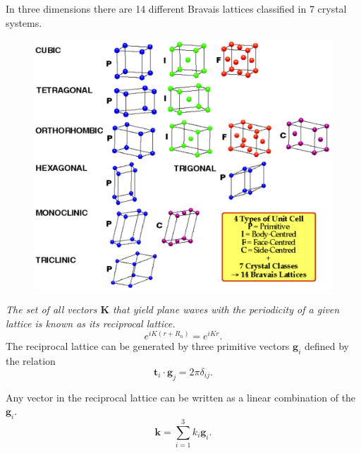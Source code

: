 \documentclass[12pt,a4paper,english]{beamer}
\newcommand{\mbf}{ \mathbf }
\begin{document}
\begin{frame}
  In three dimensions there are 14 different Bravais lattices classified in 7
  crystal systems.

  \begin{figure}[htp]
\centering
\includegraphics[scale=0.3]{Bravais}
\label{fig:bravais}
\end{figure}
\end{frame}

\begin{frame}
  \emph{The set of all vectors $\mbf{K}$ that yield plane waves with the periodicity of a given lattice is known as its reciprocal lattice.}
  $$e^{iK(r+R_n)}=e^{iKr}.$$
  The reciprocal lattice can be generated by three primitive vectors $\mbf g_i$
  defined by the relation 
  $$\mbf t_i\cdot \mbf g_j=2\pi\delta_{ij}.$$

  Any vector in the reciprocal lattice can be written as a linear combination of  the $\mbf g_i.$
  $$\mbf k= \sum_{i=1}^3 k_i\mbf g_i.$$

\end{frame}

\end{document}
